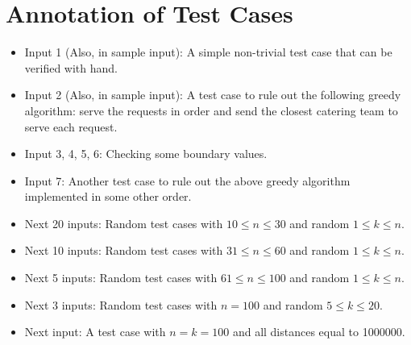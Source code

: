 \documentclass[10pt]{article}
\begin{document}
\section*{Annotation of Test Cases}
\begin{itemize}
\item 
	Input 1 (Also, in sample input): A simple non-trivial test case that can be verified with hand.
\item 
	Input 2 (Also, in sample input): A test case to rule out the following greedy algorithm: 
	serve the requests in order and send the closest catering team to serve each request.

\item 
	Input 3, 4, 5, 6: Checking some boundary values.

\item 
	Input 7: Another test case to rule out the above greedy algorithm implemented in some other 
	order. 
	
\item 
	Next 20 inputs: Random test cases with $10 \le n \le 30$ and random $1 \le k \le n$.

\item 
	Next 10 inputs: Random test cases with $31 \le n \le 60$ and random $1 \le k \le n$.

\item 
	Next 5 inputs: Random test cases with $61 \le n \le 100$ and random $1 \le k \le n$.

\item 
	Next 3 inputs: Random test cases with $n = 100$ and random $5 \le k \le 20$.

\item 
	Next input: A test case with $n = k = 100$ and all distances equal to 1000000.

\end{itemize}
\end{document}
